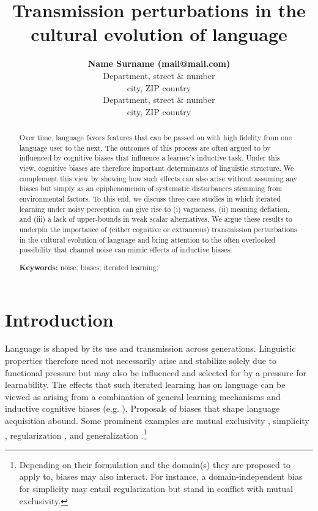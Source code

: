 \documentclass[10pt,a4paper]{article}
\title{Transmission perturbations in the cultural evolution of language}
\author{{\large \bf Name Surname (mail@mail.com)} \\
  Department, street \& number \\
  city, ZIP country
  \AND {\large \bf Name Surname (mail@mail.com)} \\
  Department, street \& number \\
  city, ZIP country}
\begin{document}
\maketitle

\begin{abstract}
Over time, language favors features that can be passed on with high fidelity from one language user to the next. The outcomes of this process are often argued to by influenced by cognitive biases that influence a learner's inductive task. Under this view, cognitive biases are therefore important determinants of linguistic structure. We complement this view by showing how such effects can also arise without assuming any biases but simply as an epiphenomenon of systematic disturbances stemming from environmental factors. To this end, we discuss three case studies in which iterated learning under noisy perception can give rise to (i) vagueness, (ii) meaning deflation, and (iii) a lack of upper-bounds in weak scalar alternatives. We argue these results to underpin the importance of (either cognitive or extraneous) transmission perturbations in the cultural evolution of language and bring attention to the often overlooked possibility that channel noise can mimic effects of inductive biases.

\textbf{Keywords:} 
noise; biases; iterated learning;   
\end{abstract}
\section{Introduction}
Language is shaped by its use and transmission across generations. Linguistic properties therefore need not necessarily arise and stabilize solely due to functional pressure but may also be influenced and selected for by a pressure for learnability. The effects that such iterated learning has on language can be viewed as arising from a combination of general learning mechanisms and inductive cognitive biases (e.g. \citealt{griffiths+kalish:2007,kirby+etal:2014,tamariz+kirby:2016}). Proposals of biases that shape language acquisition abound. Some prominent examples are mutual exclusivity \citep{merriman+bowman:1989,clark:2009}, simplicity \citep{kirby+etal:2015}, regularization \citep{hudson+etal:2005}, and generalization \citep{smith:2011,oconnor:2015}.\footnote{Depending on their formulation and the domain(s) they are proposed to apply to, biases may also interact. For instance, a domain-independent bias for simplicity may entail regularization but stand in conflict with mutual exclusivity.} 
\end{document}
